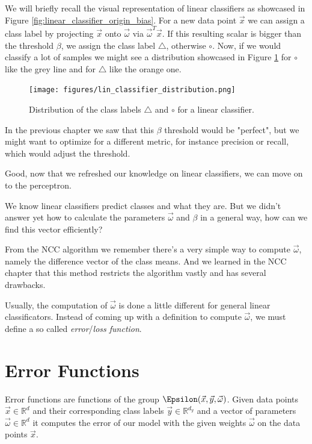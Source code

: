 We will briefly recall the visual representation of linear classifiers as showcased in Figure \ref{fig:linear_classifier_origin_bias}.
For a new data point $\vec{x}$ we can assign a class label by projecting $\vec{x}$ onto $\vec{\omega}$ via $\vec{\omega}^T \vec{x}$.
If this resulting scalar is bigger than the threshold $\beta$, we assign the class label $\triangle$, otherwise $\circ$.
Now, if we would classify a lot of samples we might see a distribution showcased in Figure \ref{fig:lin_classifier_distribution} for $\circ$ like the grey line and for $\triangle$ like the orange one.


\begin{figure}[h]
  \centering
  \texttt{[image: figures/lin\_classifier\_distribution.png]}
  \caption{Distribution of the class labels $\triangle$ and $\circ$ for a linear classifier.}
  \label{fig:lin_classifier_distribution}
\end{figure}

In the previous chapter we saw that this $\beta$ threshold would be "perfect", but we might want to optimize for a different metric, for instance precision or recall, which would adjust the threshold.

Good, now that we refreshed our knowledge on linear classifiers, we can move on to the perceptron.

We know linear classifiers predict classes and what they are. But we didn't answer yet how to calculate the parameters $\vec{\omega}$ and $\beta$ in a general way, how can we find this vector efficiently?

From the NCC algorithm we remember there's a very simple way to compute $\vec{\omega}$, namely the difference vector of the class means. And we learned in the NCC chapter that this method
restricts the algorithm vastly and has several drawbacks.

Usually, the computation of $\vec{\omega}$ is done a little different for general linear classificators. Instead of coming up with a definition to compute $\vec{\omega}$, we must define a so called \textit{error}/\textit{loss function}.

\section{Error Functions}
Error functions are functions of the group $\Epsilon(\vec{x}, \vec{y}, \vec{\omega})$.
Given data points $\vec{x} \in \mathbb{R}^d$ and their corresponding class labels $\vec{y} \in \mathbb{R}^{d_y}$ and a vector of parameters $\vec{\omega} \in \mathbb{R}^d$
it computes the error of our model with the given weights $\vec{\omega}$ on the data points $\vec{x}$.


